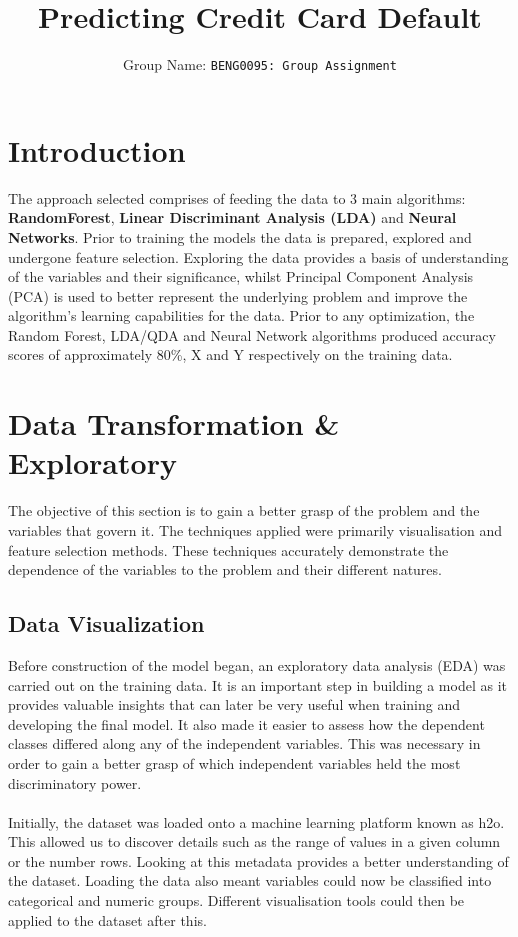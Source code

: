 \documentclass{article}
\title{Predicting Credit Card Default}
\author{
 Group Name: \texttt{BENG0095: Group Assignment}\\
}
\begin{document}
\maketitle

\section{Introduction}
The approach selected comprises of feeding the data to 3 main algorithms: \textbf{RandomForest}, \textbf{Linear Discriminant Analysis (LDA)} and \textbf{Neural Networks}. Prior to training the models the data is prepared, explored and undergone feature selection. Exploring the data provides a basis of understanding  of the variables and their significance, whilst Principal Component Analysis (PCA) is used to better represent the underlying problem and improve the algorithm’s learning capabilities for the data. Prior to any optimization, the Random Forest, LDA/QDA and Neural Network algorithms produced accuracy scores of approximately 80\%, X and Y respectively on the training data.

\section{Data Transformation \& Exploratory}
The objective of this section is to gain a better grasp of the problem and the variables that govern it. The techniques applied were primarily visualisation and feature selection methods. These techniques accurately demonstrate the dependence of the variables to the problem and their different natures.

\subsection{Data Visualization}
Before construction of the model began, an exploratory data analysis (EDA) was carried out on the training data. It is an important step in building a model as it provides valuable insights that can later be very useful when training and developing the final model. It also made it easier to assess how the dependent classes differed along any of the independent variables. This was necessary in order to gain a better grasp of which independent variables held the most discriminatory power.  \\ \\
 
Initially, the dataset was loaded onto a machine learning platform known as h2o\cite{h2o}. This allowed us to discover details such as the range of values in a given column or the number rows. Looking at this metadata provides a better understanding of the dataset. Loading the data also meant variables could now be classified into categorical and numeric groups. Different visualisation tools could then be applied to the dataset after this.
\end{document}
